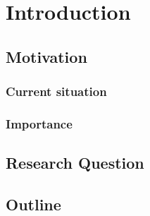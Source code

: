 \chapter{Introduction}
\section{Motivation}
\subsection{Current situation}
\subsection{Importance}
\section{Research Question}
\section{Outline}